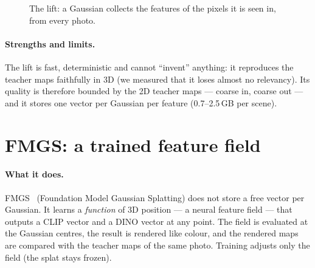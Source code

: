 \documentclass[11pt,a4paper]{article}
\newcommand{\vect}[1]{\mathbf{#1}}
\begin{document}
\begin{figure}[ht]
\centering
{}
\caption{The lift: a Gaussian collects the features of the pixels it is seen in, from every photo.}
\end{figure}

\paragraph{Strengths and limits.} The lift is fast, deterministic and cannot ``invent'' anything: it reproduces the
teacher maps faithfully in 3D (we measured that it loses almost no relevancy). Its quality is therefore bounded by the
2D teacher maps --- coarse in, coarse out --- and it stores one vector per Gaussian per feature (0.7--2.5\,GB per scene).

\section{FMGS: a trained feature field}

\paragraph{What it does.} FMGS~\cite{fmgs} (Foundation Model Gaussian Splatting) does not store a free vector per
Gaussian. It learns a \emph{function} of 3D position --- a neural feature field --- that outputs a CLIP vector and a
DINO vector at any point. The field is evaluated at the Gaussian centres, the result is rendered like colour, and the
rendered maps are compared with the teacher maps of the same photo. Training adjusts only the field (the splat stays
frozen).
\end{document}
